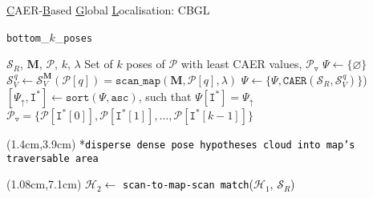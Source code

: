 \begin{frame}{\underline{C}AER-\underline{B}ased \underline{G}lobal \underline{L}ocalisation: CBGL}
\begin{minipage}{0.46\textwidth}
\begin{algorithm}[H]
        \caption{\texttt{bottom}\_$k$\_\texttt{poses}}
        \begin{spacing}{1.2}
          \begin{algorithmic}[1]
            \REQUIRE $\mathcal{S}_R$, $\bm{M}$, $\mathcal{P}$, $k$, $\lambda$
            \ENSURE Set of $k$ poses of $\mathcal{P}$ with least CAER values, $\mathcal{P}_{\triangledown}$
            \STATE $\Psi \leftarrow \{\varnothing \}$
            \STATE $\mathcal{S}_V^{\hspace{1pt} q} \leftarrow \mathcal{S}_V^{\bm{M}}(\mathcal{P}[q]) = \texttt{scan\_map}(\bm{M}, \mathcal{P}[q], \lambda)$
            \STATE $\Psi \leftarrow \{\Psi, \texttt{CAER}(\mathcal{S}_R, \mathcal{S}_V^{\hspace{1pt} q}) \}$)
            \ENDFOR
            \STATE $[\Psi_{\uparrow}, \texttt{I}^{\ast}] \leftarrow \texttt{sort}(\Psi, \texttt{asc})$, such that $\Psi[\texttt{I}^{\ast}] = \Psi_{\uparrow}$
            \RETURN $\mathcal{P}_{\triangledown} = \{\mathcal{P}[\texttt{I}^{\ast}[0]], \mathcal{P}[\texttt{I}^{\ast}[1]], \dots, \mathcal{P}[\texttt{I}^{\ast}[k-1]]\}$
          \end{algorithmic}
        \end{spacing}
        \label{alg:bottom_k}
      \end{algorithm}
  \end{minipage}

  \begin{textblock*}{6cm}(1.4cm,3.9cm) %
    \textcolor{black}{*\texttt{disperse dense pose hypotheses cloud into map's traversable area}}
  \end{textblock*}

  \begin{textblock*}{7cm}(1.08cm,7.1cm) %
    \textcolor{black}{\small* $\mathcal{H}_2 \leftarrow$ \texttt{scan-to-map-scan match}($\mathcal{H}_1$, $\mathcal{S}_R$)}
  \end{textblock*}

\end{frame}
